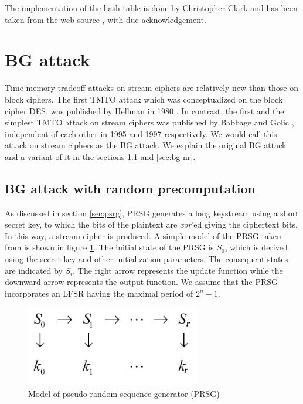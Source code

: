 The implementation of the hash table is done by Christopher Clark and has been taken from the web source \cite{hash-table-impl}, with due acknowledgement. 


\section{BG attack}
Time-memory tradeoff attacks on stream ciphers are relatively new than those on block ciphers. The first TMTO attack which was conceptualized on the block cipher DES, was published by Hellman in 1980 \cite{hellman1980ctm}. In contrast, the first and the simplest TMTO attack on stream ciphers was published by Babbage \cite{babbage} and Golic \cite{golic}, independent of each other in 1995 and 1997 respectively. We would call this attack on stream ciphers as the BG attack. We explain the original BG attack and a variant of it in the sections \ref{sec:bg-r} and \ref{sec:bg-nr}.

\subsection{BG attack with random precomputation}
\label{sec:bg-r}

As discussed in section \ref{sec:psrg}, PRSG generates a long keystream using a short secret key, to which the bits of the plaintext are \emph{xor}'ed giving the ciphertext bits. In this way, a stream cipher is produced. A simple model of the PRSG taken from \cite{babbage} is shown in figure \ref{fig:psrg-model}. The initial state of the PRSG is $S_0$, which is derived using the secret key and other initialization parameters. The consequent states are indicated by $S_i$. The right arrow represents the update function while the downward arrow represents the output function. We assume that the PRSG incorporates an LFSR having the maximal period of $2^{n} - 1$.

\begin{figure}[h]
	\centering
	\includegraphics[width=3in]{./figures/prsgmodel.png}
	\caption{Model of pseudo-random sequence generator (PRSG)}	
	\label{fig:psrg-model}
\end{figure}

